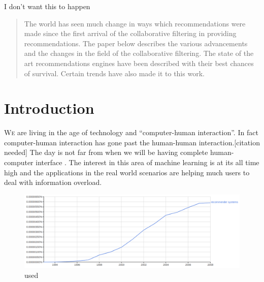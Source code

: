 \documentclass[10pt,conference]{IEEEtran}
\begin{document}
I don't want this to happen
\fi


\maketitle

\begin{abstract}
	The world has seen much change in ways which recommendations were made since the first arrival of the collaborative filtering in providing recommendations. The paper below describes the various advancements and the changes in the field of the collaborative filtering. The state of the art recommendations engines have been described with their best chances of survival. Certain trends have also made it to this work.
\end{abstract}






%
\IEEEpeerreviewmaketitle


\section{Introduction}
\lettrine[lines=2, findent=1pt, nindent=0pt]{W}e are living in the age of technology and ``computer-human interaction''. In fact computer-human interaction has gone past the human-human interaction.[citation needed] The day is not far from when we will be having complete human-computer interface .
The interest in this area of machine learning is at its all time high and the applications in the real world scenarios are helping much users to deal with information overload.


\begin{figure}
\centering
        \includegraphics[width=\textwidth]{images/history-use}
    \caption{used}
    \label{fig:verticalcell}
\end{figure}
\end{document}
